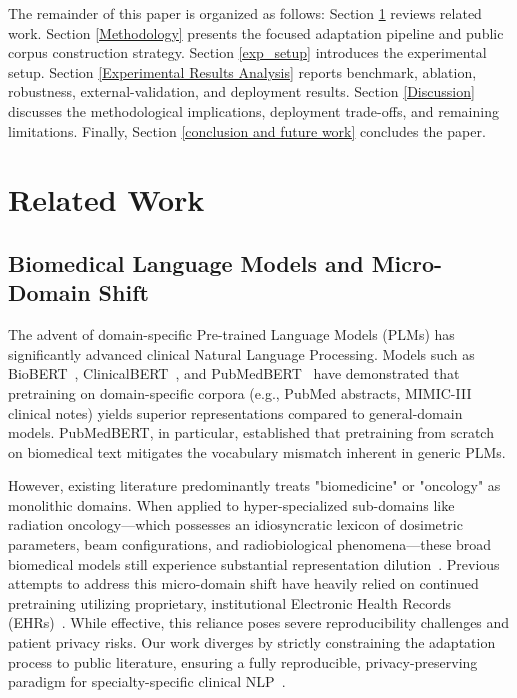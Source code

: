 \documentclass[a4paper,fleqn]{cas-dc}
\begin{document}
The remainder of this paper is organized as follows: Section \ref{Related work} reviews related work. Section \ref{Methodology} presents the focused adaptation pipeline and public corpus construction strategy. Section \ref{exp_setup} introduces the experimental setup. Section \ref{Experimental Results Analysis} reports benchmark, ablation, robustness, external-validation, and deployment results. Section \ref{Discussion} discusses the methodological implications, deployment trade-offs, and remaining limitations. Finally, Section \ref{conclusion and future work} concludes the paper.


\section{Related Work} \label{Related work}

\subsection{Biomedical Language Models and Micro-Domain Shift}
The advent of domain-specific Pre-trained Language Models (PLMs) has significantly advanced clinical Natural Language Processing. Models such as BioBERT~\cite{lee2020biobert}, ClinicalBERT~\cite{alsentzer2019publicly}, and PubMedBERT~\cite{gu2021domain} have demonstrated that pretraining on domain-specific corpora (e.g., PubMed abstracts, MIMIC-III clinical notes) yields superior representations compared to general-domain models. PubMedBERT, in particular, established that pretraining from scratch on biomedical text mitigates the vocabulary mismatch inherent in generic PLMs.

However, existing literature predominantly treats "biomedicine" or "oncology" as monolithic domains. When applied to hyper-specialized sub-domains like radiation oncology—which possesses an idiosyncratic lexicon of dosimetric parameters, beam configurations, and radiobiological phenomena—these broad biomedical models still experience substantial representation dilution~\cite{lehman2023we}. Previous attempts to address this micro-domain shift have heavily relied on continued pretraining utilizing proprietary, institutional Electronic Health Records (EHRs)~\cite{wornow2023shaky}. While effective, this reliance poses severe reproducibility challenges and patient privacy risks. Our work diverges by strictly constraining the adaptation process to public literature, ensuring a fully reproducible, privacy-preserving paradigm for specialty-specific clinical NLP~\cite{xie2024me, tariq2025open, builtjes2025leveraging}.
\end{document}
